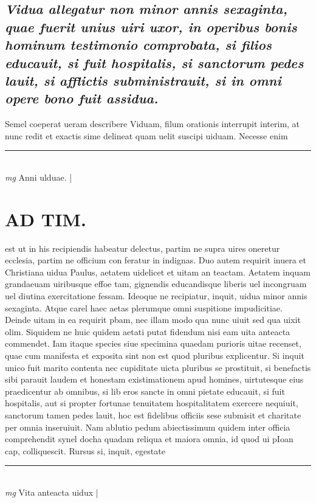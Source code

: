 \documentclass{article}
\begin{document}
\begin{pages}
\subsection*{\textit{Vidua allegatur non minor annis sexaginta, quae fuerit unius uiri uxor, in operibus bonis hominum testimonio comprobata, si filios educauit, si fuit hospitalis, si sanctorum pedes lauit, si afflictis subministrauit, si in omni opere bono fuit assidua. }}\pstart Semel coeperat ueram describere Viduam, filum orationis interrupit interim, at nunc redit et exactis sime delineat quam uelit suscipi uiduam. Necesse enim  \pend
\vspace{0.5cm}\noindent
\vspace{0.2cm}\rule{1cm}{0.2pt}\\ 
\hspace{0.2cm}\textit{mg}
\footnotesize Anni ulduae. 
\normalsize| 
\section*{AD TIM. }
\marginpar{[ p.152 ]}\pstart est ut in his recipiendis habeatur delectus, partim ne supra uires oneretur ecclesia, partim ne officium con feratur in indignas. Duo autem requirit inuera et Christiana uidua Paulus, aetatem uidelicet et uitam an teactam. Aetatem inquam grandaeuam uiribusque effoe tam, gignendis educandisque liberis uel incongruam uel diutina exercitatione fessam. Ideoque ne recipiatur, inquit, uidua minor annis sexaginta. Atque carel haec aetas plerumque omni suspitione impudicitiae. Deinde uitam in ea requirit pbam, nec illam modo qua nunc uiuit sed qua uixit olim. Siquidem ne huic quidem aetati putat fidendum nisi eam uita anteacta commendet. Iam itaque species siue specimina quaedam purioris uitae recenset, quae cum manifesta et exposita sint non est quod pluribus explicentur. Si inquit unico fuit marito contenta nec cupiditate uicta pluribus se prostituit, si benefactis sibi parauit laudem et honestam existimationem apud homines, uirtutesque eius praedicentur ab omnibus, si lib eros sancte in omni pietate educauit, si fuit hospitalis, aut si propter fortunae tenuitatem hospitalitatem exercere nequiuit, sanctorum tamen pedes lauit, hoc est fidelibus officiis sese submisit et charitate per omnia inseruiuit. Nam ablutio pedum abiectissimum quidem inter officia comprehendit synel docha quadam reliqua et maiora omnia, id quod ui pIoan cap, colliquescit. Rursus si, inquit, egestate  \pend
\vspace{0.5cm}\noindent
\vspace{0.2cm}\rule{1cm}{0.2pt}\\ 
\hspace{0.2cm}\textit{mg}
\footnotesize Vita anteacta uidux 
\normalsize| 

\end{pages}
\end{document}
